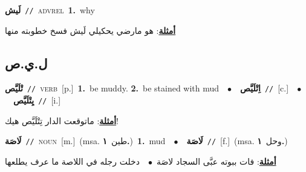 \documentclass[10pt,a4paper,twoside]{article} %
\begin{document}
\begin{multicols}{2}
{\setlength\topsep{0pt}\textbf{\foreignlanguage{arabic}{لَيش}}\ {\color{gray}\texttt{//}\color{black}}\ \textsc{adv\textunderscore rel}\ \textbf{1.}~why\  \begin{flushright}\color{gray}\foreignlanguage{arabic}{\textbf{\underline{\foreignlanguage{arabic}{أمثلة}}}: هو مارضي يحكيلي لَيش فسخ خطوبته منها}\end{flushright}\color{black}} \vspace{2mm}

\vspace{-3mm}
\subsection*{\color{blue}\foreignlanguage{arabic}{ل.ي.ص}\color{blue}{}} 

{\setlength\topsep{0pt}\textbf{\foreignlanguage{arabic}{تْلَيَّص}}\ {\color{gray}\texttt{//}\color{black}}\ \textsc{verb}\ [p.]\ \textbf{1.}~be muddy.  \textbf{2.}~be stained with mud\ \ $\bullet$\ \ \setlength\topsep{0pt}\textbf{\foreignlanguage{arabic}{اِتْلَيَّص}}\ {\color{gray}\texttt{//}\color{black}}\ [c.]\ \ $\bullet$\ \ \setlength\topsep{0pt}\textbf{\foreignlanguage{arabic}{يِتْلَيَّص}}\ {\color{gray}\texttt{//}\color{black}}\ [i.]\  \begin{flushright}\color{gray}\foreignlanguage{arabic}{\textbf{\underline{\foreignlanguage{arabic}{أمثلة}}}: ماتوقعت الدار تِتْلَيَّص هيك!}\end{flushright}\color{black}} \vspace{2mm}

{\setlength\topsep{0pt}\textbf{\foreignlanguage{arabic}{لَاصَة}}\ {\color{gray}\texttt{//}\color{black}}\ \textsc{noun}\ [m.]\ \color{gray}(msa. \foreignlanguage{arabic}{طين}~\foreignlanguage{arabic}{\textbf{١.}})\color{black}\ \textbf{1.}~mud\ \ $\bullet$\ \ \setlength\topsep{0pt}\textbf{\foreignlanguage{arabic}{لَاصَة}}\ {\color{gray}\texttt{//}\color{black}}\ [f.]\ \color{gray}(msa. \foreignlanguage{arabic}{وحل}~\foreignlanguage{arabic}{\textbf{١.}})\color{black}\  \begin{flushright}\color{gray}\foreignlanguage{arabic}{\textbf{\underline{\foreignlanguage{arabic}{أمثلة}}}: فات ببوته عبَّى السجاد لاصَة\ $\bullet$\ \  دخلت رجله في اللاصة ما عرف يطلعها}\end{flushright}\color{black}} \vspace{2mm}


\end{multicols}
\end{document}
